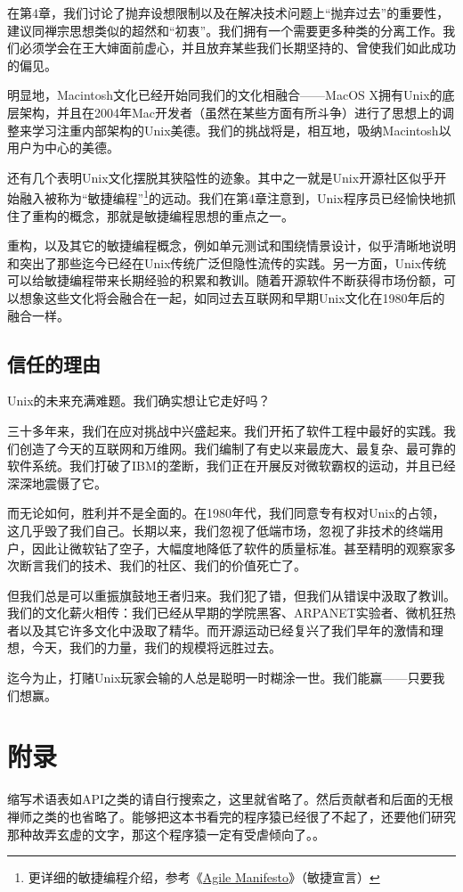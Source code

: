 \documentclass[12pt,oneside]{book}
\begin{document}
在第4章，我们讨论了抛弃设想限制以及在解决技术问题上“抛弃过去”的重要性，建议同禅宗思想类似的超然和“初衷”。我们拥有一个需要更多种类的分离工作。我们必须学会在王大婶面前虚心，并且放弃某些我们长期坚持的、曾使我们如此成功的偏见。

明显地，Macintosh文化已经开始同我们的文化相融合——MacOS X拥有Unix的底层架构，并且在2004年Mac开发者（虽然在某些方面有所斗争）进行了思想上的调整来学习注重内部架构的Unix美德。我们的挑战将是，相互地，吸纳Macintosh以用户为中心的美德。

还有几个表明Unix文化摆脱其狭隘性的迹象。其中之一就是Unix开源社区似乎开始融入被称为“敏捷编程”\footnote{更详细的敏捷编程介绍，参考《\href{http://agilemanifesto.org/}{Agile Manifesto}》（敏捷宣言）}的远动。我们在第4章注意到，Unix程序员已经愉快地抓住了重构的概念，那就是敏捷编程思想的重点之一。

重构，以及其它的敏捷编程概念，例如单元测试和围绕情景设计，似乎清晰地说明和突出了那些迄今已经在Unix传统广泛但隐性流传的实践。另一方面，Unix传统可以给敏捷编程带来长期经验的积累和教训。随着开源软件不断获得市场份额，可以想象这些文化将会融合在一起，如同过去互联网和早期Unix文化在1980年后的融合一样。

\section{信任的理由}
Unix的未来充满难题。我们确实想让它走好吗？

三十多年来，我们在应对挑战中兴盛起来。我们开拓了软件工程中最好的实践。我们创造了今天的互联网和万维网。我们编制了有史以来最庞大、最复杂、最可靠的软件系统。我们打破了IBM的垄断，我们正在开展反对微软霸权的运动，并且已经深深地震慑了它。

而无论如何，胜利并不是全面的。在1980年代，我们同意专有权对Unix的占领，这几乎毁了我们自己。长期以来，我们忽视了低端市场，忽视了非技术的终端用户，因此让微软钻了空子，大幅度地降低了软件的质量标准。甚至精明的观察家多次断言我们的技术、我们的社区、我们的价值死亡了。

但我们总是可以重振旗鼓地王者归来。我们犯了错，但我们从错误中汲取了教训。我们的文化薪火相传：我们已经从早期的学院黑客、ARPANET实验者、微机狂热者以及其它许多文化中汲取了精华。而开源运动已经复兴了我们早年的激情和理想，今天，我们的力量，我们的规模将远胜过去。

迄今为止，打赌Unix玩家会输的人总是聪明一时糊涂一世。我们能赢——只要我们想赢。

\chapter{附录}
缩写术语表如API之类的请自行搜索之，这里就省略了。然后贡献者和后面的无根禅师之类的也省略了。能够把这本书看完的程序猿已经很了不起了，还要他们研究那种故弄玄虚的文字，那这个程序猿一定有受虐倾向了。。
\end{document}
